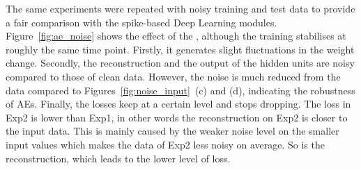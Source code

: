 The same experiments were repeated with noisy training and test data to provide a fair comparison with the spike-based Deep Learning modules.
Figure~\ref{fig:ae_noise} shows the effect of the \DIFdelbegin {}\DIFdelend \DIFaddbegin {}\DIFaddend , although the training stabilises at roughly the same time point.
Firstly, it generates slight fluctuations in the weight change.
Secondly, the reconstruction and the output of the hidden units are noisy compared to those of clean data.
However, the noise is much reduced from the \DIFdelbegin {}\DIFdelend \DIFaddbegin {}\DIFaddend data compared to Figures~\ref{fig:noise_input}~(c) and (d), indicating the robustness of AEs. 
Finally, the losses keep at a certain level and stops dropping.
The loss in Exp2 is lower than Exp1, in other words the reconstruction on Exp2 is closer to the input data.
This is mainly caused by the weaker noise level on the smaller input values which makes the data of Exp2 less noisy on average.
So is the reconstruction, which leads to the lower level of loss.
